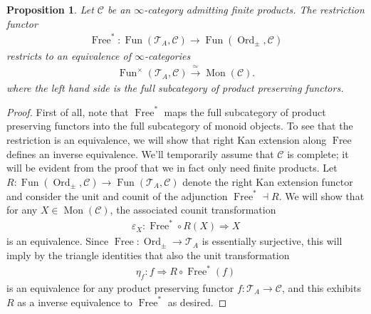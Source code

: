 \documentclass[12pt, reqno]{amsart}
\theoremstyle{plain}
\newtheorem{proposition}[theorem]{Proposition}
\theoremstyle{definition}
\renewcommand{\epsilon}{\varepsilon}
\begin{document}
\begin{proposition}\label{monoid objects as product preserving functors}
Let $\mathcal{C}$ be an $\infty$-category admitting finite products. The restriction functor
\begin{align*}
\operatorname{Free}^*\colon \operatorname{Fun}(\mathcal{T}_A, \mathcal{C})\rightarrow \operatorname{Fun}(\operatorname{Ord}_\pm, \mathcal{C})
\end{align*}
restricts to an equivalence of $\infty$-categories
\begin{align*}
\operatorname{Fun}^\times(\mathcal{T}_A, \mathcal{C})\xrightarrow{\ \simeq\ } \operatorname{Mon}(\mathcal{C}).
\end{align*}
where the left hand side is the full subcategory of product preserving functors.
\end{proposition}
\begin{proof}
First of all, note that $\operatorname{Free}^*$ maps the full subcategory of product preserving functors into the full subcategory of monoid objects. To see that the restriction is an equivalence, we will show that right Kan extension along $\operatorname{Free}$ defines an inverse equivalence. We'll temporarily assume that $\mathcal{C}$ is complete; it will be evident from the proof that we in fact only need finite products. Let $R\colon \operatorname{Fun}(\operatorname{Ord}_\pm, \mathcal{C})\rightarrow \operatorname{Fun}(\mathcal{T}_A, \mathcal{C})$ denote the right Kan extension functor and consider the unit and counit of the adjunction $\operatorname{Free}^*\dashv R$. We will show that for any $X\in \operatorname{Mon}(\mathcal{C})$, the associated counit transformation
\begin{align*}
\epsilon_X\colon \operatorname{Free}^*\circ R(X) \Rightarrow X
\end{align*}
is an equivalence. Since  $\operatorname{Free}\colon \operatorname{Ord}_\pm \rightarrow \mathcal{T}_A$ is essentially surjective, this will imply by the triangle identities that also the unit transformation
\begin{align*}
\eta_{f}\colon f\Rightarrow R\circ \operatorname{Free}^*(f)
\end{align*}
is an equivalence for any product preserving functor $f\colon \mathcal{T}_A\rightarrow \mathcal{C}$, and this exhibits $R$ as a inverse equivalence to $\operatorname{Free}^*$ as desired.


\end{proof}
\end{document}
